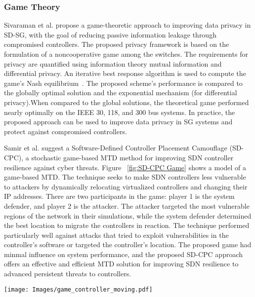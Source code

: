 \documentclass[conference]{IEEEtran}
\begin{document}
\subsubsection{Game Theory}Sivaraman et al. \cite{sivaraman2020game} propose a game-theoretic approach to improving data privacy in SD-SG, with the goal of reducing passive information leakage through compromised controllers. The proposed privacy framework is based on the formulation of a noncooperative game among the switches. The requirements for privacy are quantified using information theory mutual information and differential privacy. An iterative best response algorithm is used to compute the game's Nash equilibrium~\cite{daskalakis2009complexity}. The proposed scheme's performance is compared to the globally optimal solution and the exponential mechanism (for differential privacy).When compared to the global solutions, the theoretical game performed nearly optimally on the IEEE 30, 118, and 300 \cite{pstca2018} bus systems. In practice, the proposed approach can be used to improve data privacy in SG systems and protect against compromised controllers.


Samir et al.  \cite{samir2021sd}  suggest a Software-Defined Controller Placement Camouflage (SD-CPC), a stochastic game-based MTD method for improving SDN controller resilience against cyber threats. Figure ~\ref{fig:SD-CPC Game} shows a model of a game-based MTD. The technique seeks to make SDN controllers less vulnerable to attackers by dynamically relocating virtualized controllers and changing their IP addresses. There are two participants in the game: player 1 is the system defender, and player 2 is the attacker. The attacker targeted the most vulnerable regions of the network in their simulations, while the system defender determined the best location to migrate the controllers in reaction. The technique performed particularly well against attacks that tried to exploit vulnerabilities in the controller's software or targeted the controller's location. The proposed game had minmal influence on system performance, and the proposed SD-CPC approach offers an effective and efficient MTD solution for improving SDN resilience to advanced persistent threats to controllers.

\begin{figure*}[h]
\centering
\texttt{[image: Images/game\_controller\_moving.pdf]}
\caption{SD-SD MTD Game Example}
\label{fig:SD-CPC Game}
\end{figure*}
\end{document}
